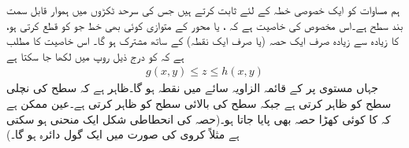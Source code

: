 ہم مساوات  کو ایک خصوصی خطہ  کے لئے ثابت کرتے ہیں جس کی سرحد ٹکڑوں میں ہموار قابل سمت بند سطح  ہے۔اس مخصوص  کی خاصیت ہے کہ ،  یا  محور کے متوازی کوئی بھی خط جو   کو قطع کرتی ہو، کا زیادہ سے زیادہ صرف ایک  حصہ (یا صرف ایک نقطہ)  کے ساتھ مشترک ہو گا۔ اس خاصیت کا مطلب ہے کہ  کو درج ذیل روپ میں لکھا جا سکتا ہے
\begin{align}\label{مساوات_خطی_تکمل_مسئلہ_گاوس_چ}
g(x,y)\le z\le h(x,y)
\end{align}
جہاں  مستوی پر  کے قائمہ الزاویہ سائے  میں نقطہ  ہو گا۔ظاہر ہے کہ  سطح  کی نچلی سطح  کو ظاہر کرتی ہے جبکہ  سطح  کی بالائی سطح  کو ظاہر کرتی ہے۔عین ممکن ہے کہ  کا کوئی کھڑا حصہ  بھی پایا جاتا ہو۔(حصہ  کی انحطاطی شکل ایک منحنی ہو سکتی ہے مثلاً  کروی  کی صورت میں  ایک گول دائرہ ہو گا۔)   


